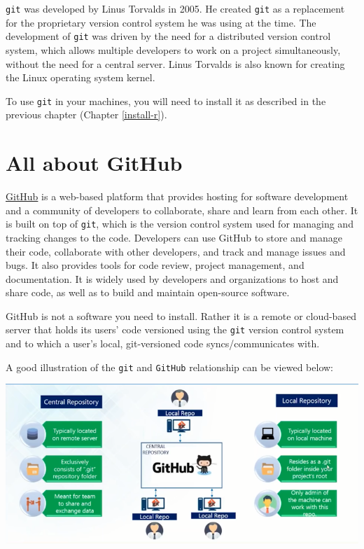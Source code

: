 \documentclass[
  12pt,
]{book}
\begin{document}
\texttt{git} was developed by Linus Torvalds in 2005. He created \texttt{git} as a replacement for the proprietary version control system he was using at the time. The development of \texttt{git} was driven by the need for a distributed version control system, which allows multiple developers to work on a project simultaneously, without the need for a central server. Linus Torvalds is also known for creating the Linux operating system kernel.

To use \texttt{git} in your machines, you will need to install it as described in the previous chapter (Chapter \ref{install-r}).

\hypertarget{all-about-github}{%
\section{All about GitHub}\label{all-about-github}}

\href{https://github.com}{GitHub} is a web-based platform that provides hosting for software development and a community of developers to collaborate, share and learn from each other. It is built on top of \texttt{git}, which is the version control system used for managing and tracking changes to the code. Developers can use GitHub to store and manage their code, collaborate with other developers, and track and manage issues and bugs. It also provides tools for code review, project management, and documentation. It is widely used by developers and organizations to host and share code, as well as to build and maintain open-source software.

GitHub is not a software you need to install. Rather it is a remote or cloud-based server that holds its users' code versioned using the \texttt{git} version control system and to which a user's local, git-versioned code syncs/communicates with.

A good illustration of the \texttt{git} and \texttt{GitHub} relationship can be viewed below:

\includegraphics{images/git_and_github01b.png}
\end{document}
